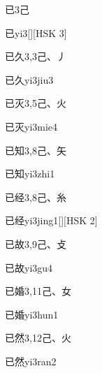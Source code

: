 \begin{Entry}{已}{3}{⼰}
  \begin{Phonetics}{已}{yi3}[][HSK 3]
  \end{Phonetics}
\end{Entry}

\begin{Entry}{已久}{3,3}{⼰、⼃}
  \begin{Phonetics}{已久}{yi3jiu3}
  \end{Phonetics}
\end{Entry}

\begin{Entry}{已灭}{3,5}{⼰、⽕}
  \begin{Phonetics}{已灭}{yi3mie4}
  \end{Phonetics}
\end{Entry}

\begin{Entry}{已知}{3,8}{⼰、⽮}
  \begin{Phonetics}{已知}{yi3zhi1}
  \end{Phonetics}
\end{Entry}

\begin{Entry}{已经}{3,8}{⼰、⽷}
  \begin{Phonetics}{已经}{yi3jing1}[][HSK 2]
  \end{Phonetics}
\end{Entry}

\begin{Entry}{已故}{3,9}{⼰、⽁}
  \begin{Phonetics}{已故}{yi3gu4}
  \end{Phonetics}
\end{Entry}

\begin{Entry}{已婚}{3,11}{⼰、⼥}
  \begin{Phonetics}{已婚}{yi3hun1}
  \end{Phonetics}
\end{Entry}

\begin{Entry}{已然}{3,12}{⼰、⽕}
  \begin{Phonetics}{已然}{yi3ran2}
  \end{Phonetics}
\end{Entry}

